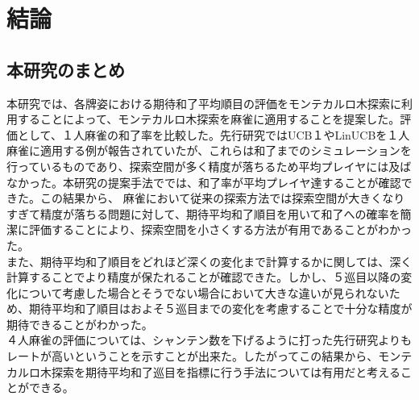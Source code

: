 \chapter{結論}
\label{chap:conclusion}
\section{本研究のまとめ}
本研究では、各牌姿における期待和了平均順目の評価をモンテカルロ木探索に利用することによって、モンテカルロ木探索を麻雀に適用することを提案した。評価として、１人麻雀の和了率を比較した。先行研究ではUCB１やLinUCBを１人麻雀に適用する例が報告されていたが、これらは和了までのシミュレーションを行っているものであり、探索空間が多く精度が落ちるため平均プレイヤには及ばなかった。本研究の提案手法ででは、和了率が平均プレイヤ達することが確認できた。この結果から、
麻雀において従来の探索方法では探索空間が大きくなりすぎて精度が落ちる問題に対して、期待平均和了順目を用いて和了への確率を簡潔に評価することにより、探索空間を小さくする方法が有用であることがわかった。
\\
また、期待平均和了順目をどれほど深くの変化まで計算するかに関しては、深く計算することでより精度が保たれることが確認できた。しかし、５巡目以降の変化について考慮した場合とそうでない場合において大きな違いが見られないため、期待平均和了順目はおよそ５巡目までの変化を考慮することで十分な精度が期待できることがわかった。
\\
４人麻雀の評価については、シャンテン数を下げるように打った先行研究よりもレートが高いということを示すことが出来た。したがってこの結果から、モンテカルロ木探索を期待平均和了巡目を指標に行う手法については有用だと考えることができる。
